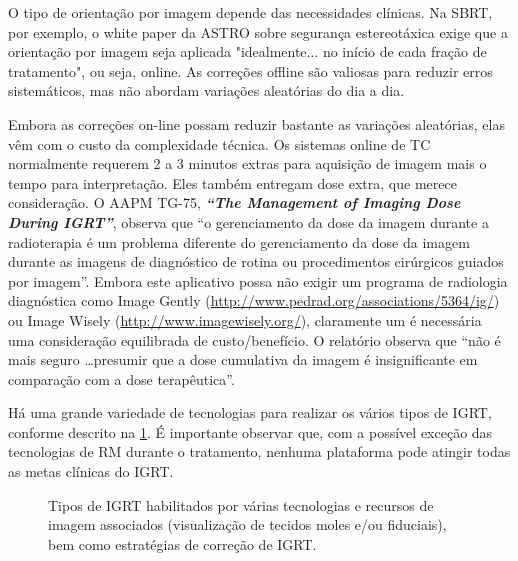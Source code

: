 \documentclass[11pt,a4paper]{article}
\newcounter{exemplo}
\begin{document}
	O tipo de orientação por imagem depende das necessidades clínicas. Na SBRT, por exemplo, o white paper da ASTRO sobre segurança estereotáxica exige que a orientação por imagem seja aplicada "idealmente... no início de cada fração de tratamento", ou seja, online. As correções offline são valiosas para reduzir erros sistemáticos, mas não abordam variações aleatórias do dia a dia.
	
	Embora as correções on-line possam reduzir bastante as variações aleatórias, elas vêm com o custo da complexidade técnica. Os sistemas online de TC normalmente requerem 2 a 3 minutos extras para aquisição de imagem mais o tempo para interpretação. Eles também entregam dose extra, que merece consideração. O AAPM TG-75, \textbf{\textit{``The Management of Imaging Dose During IGRT''}}, observa que “o gerenciamento da dose da imagem durante a radioterapia é um problema diferente do gerenciamento da dose da imagem durante as imagens de diagnóstico de rotina ou procedimentos cirúrgicos guiados por imagem”. Embora este aplicativo possa não exigir um programa de radiologia diagnóstica como Image Gently (\href{http://www.pedrad.org/associations/5364/ig/}{http://www.pedrad.org/associations/5364/ig/}) ou Image Wisely (\href{http://www.imagewisely.org/}{http://www.imagewisely.org/}), claramente um é necessária uma consideração equilibrada de custo/benefício. O relatório observa que “não é mais seguro \dots presumir que a dose cumulativa da imagem é insignificante em comparação com a dose terapêutica”.

	Há uma grande variedade de tecnologias para realizar os vários tipos de IGRT, conforme descrito na \ref{fig:tiposdeIGRT}. É importante observar que, com a possível exceção das tecnologias de RM durante o tratamento, nenhuma plataforma pode atingir todas as metas clínicas do IGRT.

	\begin{figure}[h]
		\centering
		\caption{Tipos de IGRT habilitados por várias tecnologias e recursos de imagem associados (visualização de tecidos moles e/ou fiduciais), bem como estratégias de correção de IGRT.}
		\label{fig:tiposdeIGRT}
	\end{figure}
\end{document}
